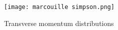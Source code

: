 \documentclass{article}
\begin{document}












\begin{figure}[htp]
\centering
\texttt{[image: marcouille simpson.png]}
\caption{Transverse momentum distributions}\label{fig:marcouille simpson.png}
\end{figure}

\end{document}

